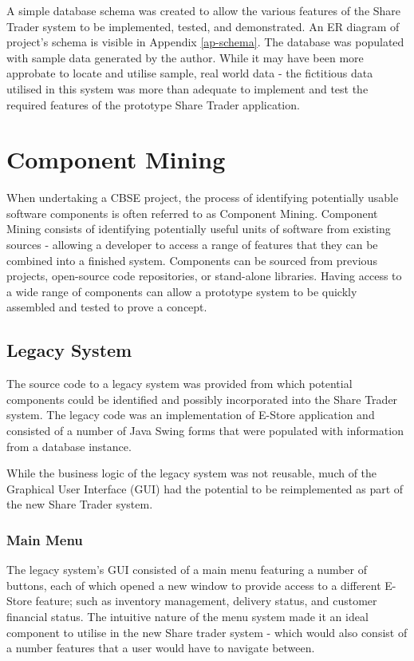 \documentclass[12pt, a4paper,titlepage]{article}
\begin{document}
A simple database schema was created to allow the various features
of the Share Trader system to be implemented, tested, and demonstrated.
An ER diagram of project's schema is visible in Appendix \ref{ap-schema}.
The database was populated with sample data generated by the author. 
While it may have been more approbate to locate and utilise sample, real world
data - the fictitious data utilised in this system was more than adequate to
implement and test the required features of the  prototype Share Trader
application.


\section{Component Mining}
When undertaking a CBSE project, the process of identifying potentially usable
software components is often referred to as Component Mining.  
Component Mining consists of identifying potentially useful units of software
from existing sources - allowing a developer to access a range of features
that they can be combined into a finished system.
Components can be sourced from previous projects, open-source code
repositories, or stand-alone libraries. 
Having access to a wide range of components can allow a prototype system to be
quickly assembled and tested to prove a concept.

\subsection{Legacy System}
The source code to a legacy system was provided from which potential
components could be identified and possibly incorporated into the Share Trader
system.  
The legacy code was an implementation of E-Store application and consisted of a
number of Java Swing forms that were populated with information from a
database instance.

While the business logic of the legacy system was not reusable, much of the
Graphical User Interface (GUI) had the potential to be reimplemented as part of
the new Share Trader system.

\subsubsection{Main Menu}
The legacy system’s GUI consisted of a main menu featuring a number of
buttons, each of which opened a new window to provide access to a different
E-Store feature; such as inventory management, delivery status, and customer
financial status.  
The intuitive nature of the menu system made it an ideal component to utilise
in the new Share trader system - which would also consist of a number features
that a user would have to navigate between.
\end{document}
